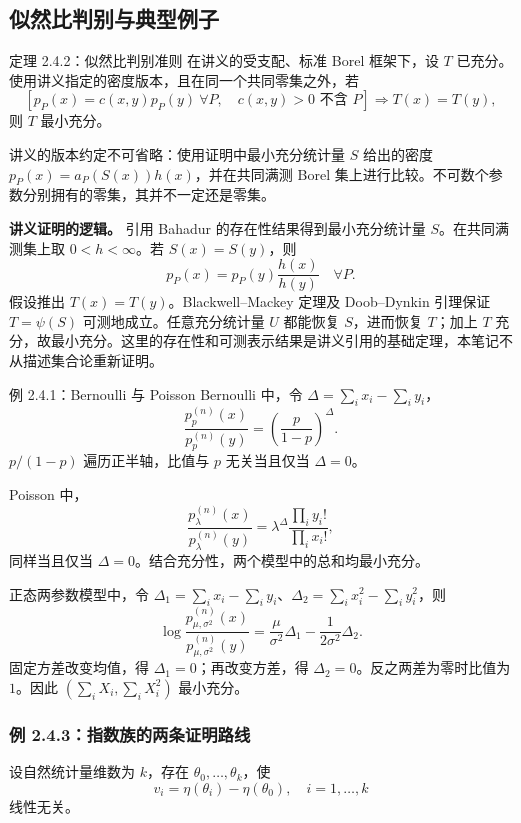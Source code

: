 \subsection{似然比判别与典型例子}
\begin{definitionbox}{定理 2.4.2：似然比判别准则}
在讲义的受支配、标准 Borel 框架下，设 $T$ 已充分。使用讲义指定的密度版本，且在同一个共同零集之外，若
\[
 \left[
 p_P(x)=c(x,y)p_P(y)\ \forall P,\quad
 c(x,y)>0\text{ 不含 }P
 \right]\Rightarrow T(x)=T(y),
\]
则 $T$ 最小充分。
\end{definitionbox}

讲义的版本约定不可省略：使用证明中最小充分统计量 $S$ 给出的密度 $p_P(x)=a_P(S(x))h(x)$，并在共同满测 Borel 集上进行比较。不可数个参数分别拥有的零集，其并不一定还是零集。

\textbf{讲义证明的逻辑。} 引用 Bahadur 的存在性结果得到最小充分统计量 $S$。在共同满测集上取 $0<h<\infty$。若 $S(x)=S(y)$，则
\[
 p_P(x)=p_P(y)\frac{h(x)}{h(y)}\quad\forall P.
\]
假设推出 $T(x)=T(y)$。Blackwell--Mackey 定理及 Doob--Dynkin 引理保证 $T=\psi(S)$ 可测地成立。任意充分统计量 $U$ 都能恢复 $S$，进而恢复 $T$；加上 $T$ 充分，故最小充分。这里的存在性和可测表示结果是讲义引用的基础定理，本笔记不从描述集合论重新证明。

\begin{examplebox}{例 2.4.1：Bernoulli 与 Poisson}
Bernoulli 中，令 $\Delta=\sum_i x_i-\sum_i y_i$，
\[
 \frac{p_p^{(n)}(x)}{p_p^{(n)}(y)}
 =\left(\frac p{1-p}\right)^\Delta.
\]
$p/(1-p)$ 遍历正半轴，比值与 $p$ 无关当且仅当 $\Delta=0$。

Poisson 中，
\[
 \frac{p_\lambda^{(n)}(x)}{p_\lambda^{(n)}(y)}
 =\lambda^\Delta\frac{\prod_i y_i!}{\prod_i x_i!},
\]
同样当且仅当 $\Delta=0$。结合充分性，两个模型中的总和均最小充分。
\end{examplebox}

正态两参数模型中，令 $\Delta_1=\sum_i x_i-\sum_i y_i$、$\Delta_2=\sum_i x_i^2-\sum_i y_i^2$，则
\[
 \log\frac{p_{\mu,\sigma^2}^{(n)}(x)}{p_{\mu,\sigma^2}^{(n)}(y)}
 =\frac{\mu}{\sigma^2}\Delta_1-\frac1{2\sigma^2}\Delta_2.
\]
固定方差改变均值，得 $\Delta_1=0$；再改变方差，得 $\Delta_2=0$。反之两差为零时比值为 $1$。因此 $(\sum_iX_i,\sum_iX_i^2)$ 最小充分。

\subsubsection{例 2.4.3：指数族的两条证明路线}
设自然统计量维数为 $k$，存在 $\theta_0,\ldots,\theta_k$，使
\[
 v_i=\eta(\theta_i)-\eta(\theta_0),\quad i=1,\ldots,k
\]
线性无关。

